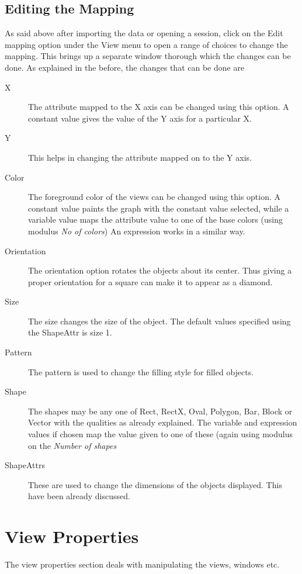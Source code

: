 \subsection{Editing the Mapping}

As said above after importing the data or opening a session, click on
the Edit mapping option under the View menu to open a range of choices
to change the mapping. This brings up a separate window thorough which
the changes can be done. As explained in the before, the changes that
can be done are

\begin{description}
\item[X] The attribute mapped to the X axis can be changed using this
option. A constant value gives the value of the Y axis for a
particular X.
\item[Y] This helps in changing the attribute mapped on to the Y axis.
\item[Color] The foreground color of the views can be changed using
this option. A constant value paints the graph with the constant value
selected, while a variable value maps the attribute value to one of
the base colors (using modulus {\em No of colors}) An expression
works in a similar way.
\item[Orientation] The orientation option rotates the objects about
its center. Thus giving a proper orientation for a square can make it
to appear as a diamond.
\item[Size] The size changes the size of the object. The default
values specified using the ShapeAttr is size 1.
\item[Pattern] The pattern is used to change the filling style for
filled objects.
\item[Shape] The shapes may be any one of Rect, RectX, Oval, Polygon,
Bar, Block or Vector with the qualities as already explained. The
variable and expression values if chosen map the value given to one of
these (again using modulus on the {\em Number of shapes}
\item[ShapeAttrs] These are used to change the dimensions of the
objects displayed. This have been already discussed.
\end{description}

\section{View Properties}

The view properties section deals with manipulating the views, windows
etc.

